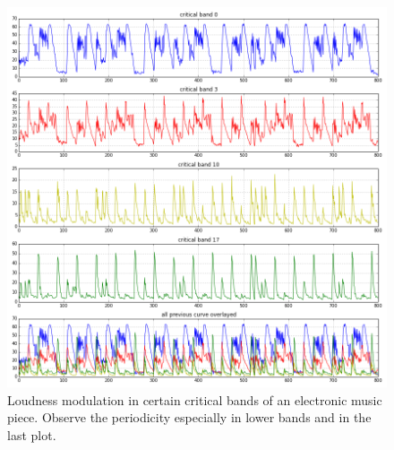 \documentclass[cic,tc,english]{iiufrgs}
\begin{document}
\begin{figure}
    \caption{Loudness modulation in certain critical bands of an electronic music piece. Observe the periodicity especially in lower bands and in the last plot.}
    \begin{center}
        \includegraphics[width=\linewidth]{periodicity}
    \end{center}
    \label{fig:periodicity}
\end{figure}
\end{document}
